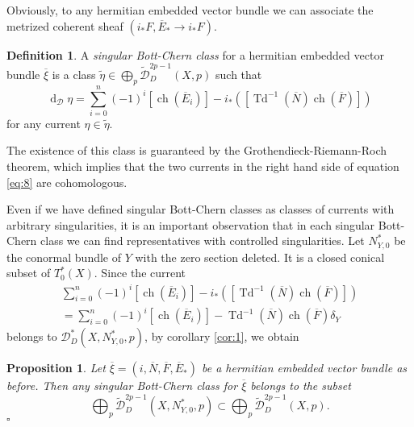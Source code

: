 \documentclass[10pt,twoside]{article}
\numberwithin{equation}{section}
\theoremstyle{plain}
\newtheorem{proposition}[equation]{Proposition}
\theoremstyle{definition}
\newtheorem{definition}[equation]{Definition}
\DeclareMathOperator{\Td}{Td}
\DeclareMathOperator{\dd}{d}
\DeclareMathOperator{\ch}{ch}
\begin{document}
Obviously, to any hermitian embedded vector bundle we can associate the
metrized coherent sheaf $(i_{\ast}F,\overline{E}_{\ast}\to
i_{\ast}F)$. 


\begin{definition}
  A \emph{singular Bott-Chern class} for a hermitian embedded vector
  bundle $\overline {\xi}$ is a class
  $\widetilde \eta\in \bigoplus_{p} \widetilde
  {\mathcal{D}}^{2p-1}_{D}(X,p)$ such that 
  \begin{equation}\label{eq:8}
    \dd_{\mathcal{D}} \eta=
    \sum_{i=0}^{n}(-1)^{i}[\ch(\overline E_{i})]-i_{\ast}
    ([\Td^{-1}(\overline N)\ch(\overline F)]) 
  \end{equation}
  for any current $\eta\in\tilde{\eta}$.  
\end{definition}

The existence of this class is guaranteed by the
Grothendieck-Riemann-Roch theorem, which implies that the two currents
in the right hand side of equation \eqref{eq:8} are cohomologous.


Even if we have defined singular Bott-Chern classes as classes of
currents with arbitrary singularities, it is an important observation
that in each singular Bott-Chern class we can find representatives
with controlled singularities. 
Let $N^{\ast}_{Y,0}$ be the conormal bundle of $Y$ with the zero
section deleted. It is a closed conical subset of $T^{\ast}_{0}(X)$. 
Since the current
\begin{multline*}
  \sum_{i=0}^{n}(-1)^{i}[\ch(\overline E_{i})] -
i_{\ast} ([\Td^{-1}(\overline N)\ch(\overline F)])\\
= \sum_{i=0}^{n}(-1)^{i}[\ch(\overline E_{i})] -
\Td^{-1}(\overline N)\ch(\overline F)\delta _{Y}
\end{multline*}
belongs to
$\mathcal{D}^{\ast}_{D}(X,N^{\ast}_{Y,0},p)$, by corollary
\ref{cor:1}, we obtain 

\begin{proposition} \label{prop:1} Let $\overline {\xi}=(i,\overline
  N,\overline F, \overline E_{\ast})$ be a
  hermitian embedded vector bundle as before. Then
any
singular Bott-Chern class for $\overline {\xi}$ belongs to the subset
\begin{displaymath}
  \bigoplus_{p}  \widetilde
  {\mathcal{D}}^{2p-1}_{D}(X,N^{\ast}_{Y,0},p)\subset
  \bigoplus_{p} \widetilde
{\mathcal{D}}^{2p-1}_{D}(X,p). 
\end{displaymath}
\hfill $\square$ 
\end{proposition}
\end{document}
